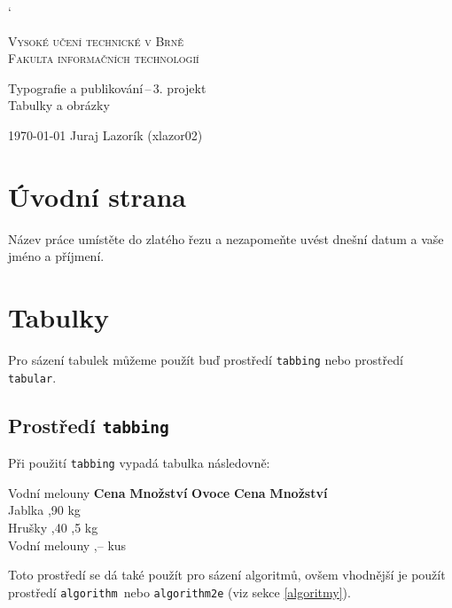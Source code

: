 \documentclass[a4paper, 11pt, hidelinks]{article}
\begin{document}
\catcode`

\begin{titlepage}

\begin{center}

\Huge\textsc{Vysoké učení technické v Brně} \\
\huge\textsc{Fakulta informačních technologií} \\   


\LARGE Typografie a publikování\,--\,3. projekt \\
\Huge Tabulky a obrázky

\end{center}

{\LARGE \today \hfill
Juraj Lazorík (xlazor02)}

\end{titlepage}

\section{Úvodní strana}
Název práce umístěte do zlatého řezu a nezapomeňte uvést dnešní datum a vaše jméno a příjmení.

\section{Tabulky}
Pro sázení tabulek můžeme použít buď prostředí \texttt{tabbing} nebo prostředí \texttt{tabular}.

\subsection{Prostředí \texttt{tabbing}}
Při použití \texttt{tabbing} vypadá tabulka následovně:
\begin{tabbing}

Vodní melouny  \quad  \= \textbf{Cena} \quad \= \textbf{Množství}    \kill
\textbf{Ovoce}           \> \textbf{Cena}       \> \textbf{Množství}    \\ 
Jablka          ,90                kg      \\
Hrušky          ,40               ,5 kg    \\
Vodní melouny   ,–                 kus     \\

\end{tabbing}
Toto prostředí se dá také použít pro sázení algoritmů, ovšem vhodnější je použít prostředí \texttt{algorithm}~nebo \texttt{algorithm2e} (viz sekce \ref{algoritmy}).
\end{document}
